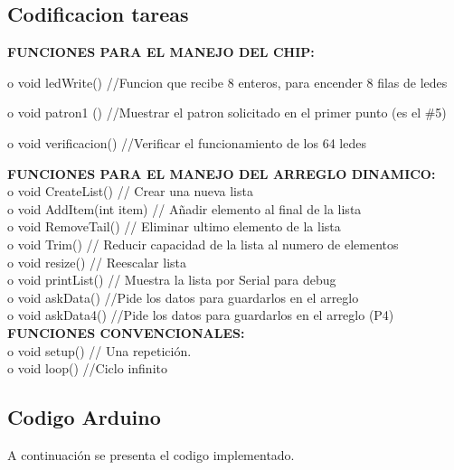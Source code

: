\documentclass{article}
\begin{document}
\subsection{Codificacion tareas}
\textbf{FUNCIONES PARA EL MANEJO DEL CHIP:}\par
o	void ledWrite() //Funcion que recibe 8 enteros, para encender 8 filas de ledes\par
o	void patron1 () //Muestrar el patron solicitado en el primer punto (es el \#5)\par
o	void verificacion() //Verificar el funcionamiento de los 64 ledes\par
\textbf{FUNCIONES PARA EL MANEJO DEL ARREGLO DINAMICO:}\\
o	void CreateList() // Crear una nueva lista\\
o	void AddItem(int item) // Añadir elemento al final de la lista\\
o	void RemoveTail() // Eliminar ultimo elemento de la lista\\
o	void Trim() // Reducir capacidad de la lista al numero de elementos\\
o	void resize() // Reescalar lista\\
o	void printList() // Muestra la lista por Serial para debug\\
o	void askData() //Pide los datos para guardarlos en el arreglo\\
o	void askData4() //Pide los datos para guardarlos en el arreglo (P4)\\
\textbf{FUNCIONES CONVENCIONALES:}\\
o	void setup() // Una repetición.\\
o	void loop() //Ciclo infinito\\

\subsection{Codigo Arduino}
%
A continuación se presenta el codigo implementado.
\end{document}
